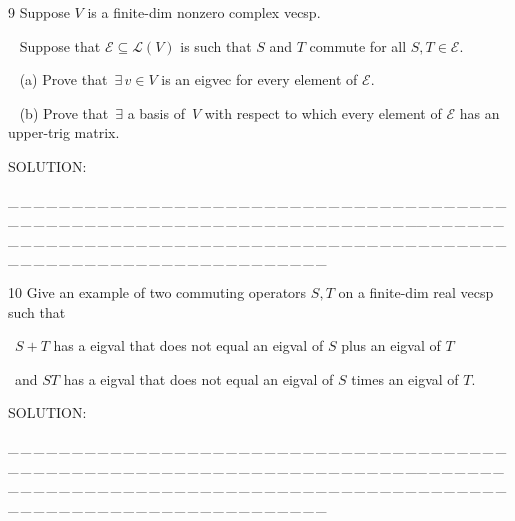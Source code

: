 \documentclass[a4paper, 11pt, UTF8]{article}
\def\Lm{\mathcal{L}}
\begin{document}
\begin{large}
{\timesbf\Large 9} {\timessl\Large 
Suppose $V$ is a finite-dim nonzero complex vecsp.}\par\,\,\,
{\timessl\Large Suppose that $\mathcal{E}\subseteq\Lm(V)$ is such that $S$ and $T$ commute for all $S, T\in\mathcal{E}$.
}\par\,\,\,
(a) {\timessl\Large Prove that $\,\exists\,v\in V$ is an eigvec for every element of $\mathcal{E}$.}\par\,\,\,
(b) {\timessl\Large Prove that $\,\exists$ a basis of \,$V$ with respect to which every element of $\mathcal{E}$ has an upper-trig matrix.}\par
{\timesbf S\footnotesize{OLUTION:}}\par\quad

\par
{\tiny \_\,\_\,\_\,\_\,\_\,\_\,\_\,\_\,\_\,\_\,\_\,\_\,\_\,\_\,\_\,\_\,\_\,\_\,\_\,\_\,\_\,\_\,\_\,\_\,\_\,\_\,\_\,\_\,\_\,\_\,\_\,\_\,\_\,\_\,\_\,\_\,\_\,\_\,\_\,\_\,\_\,\_\,\_\,\_\,\_\,\_\,\_\,\_\,\_\,\_\,\_\,\_\,\_\,\_\,\_\,\_\,\_\,\_\,\_\,\_\,\_\,\_\,\_\,\_\,\_\,\_\,\_\,\_\,\_\,\_\,\_\_\,\_\,\_\,\_\,\_\,\_\,\_\,\_\,\_\,\_\,\_\,\_\,\_\,\_\,\_\,\_\,\_\,\_\,\_\,\_\,\_\,\_\,\_\,\_\,\_\,\_\,\_\,\_\,\_\,\_\,\_\,\_\,\_\,\_\,\_\,\_\,\_\,\_\,\_\,\_\,\_\,\_\,\_\,\_\,\_\,\_\,\_\,\_\,\_\,\_\,\_\,\_\,\_\,\_\,\_\,\_\,\_\,\_\,\_\,\_\,\_\,\_\,\_\,\_\,\_\,\_\,\_\,\_\,\_\,\_\,\_}\par

{\timesbf\Large 10} {\timessl\Large 
Give an example of two commuting operators $S, T$ on a finite-dim real vecsp such that}\par\quad\,
{\timessl\Large $S + T$ has a eigval that does not equal an eigval of $S$ plus an eigval of $T$}\par\quad\,
{\timessl\Large and $ST$ has a eigval that does not equal an eigval of $S$ times an eigval of $T$.
}\par
{\timesbf S\footnotesize{OLUTION:}}\par\quad

\par
{\tiny \_\,\_\,\_\,\_\,\_\,\_\,\_\,\_\,\_\,\_\,\_\,\_\,\_\,\_\,\_\,\_\,\_\,\_\,\_\,\_\,\_\,\_\,\_\,\_\,\_\,\_\,\_\,\_\,\_\,\_\,\_\,\_\,\_\,\_\,\_\,\_\,\_\,\_\,\_\,\_\,\_\,\_\,\_\,\_\,\_\,\_\,\_\,\_\,\_\,\_\,\_\,\_\,\_\,\_\,\_\,\_\,\_\,\_\,\_\,\_\,\_\,\_\,\_\,\_\,\_\,\_\,\_\,\_\,\_\,\_\,\_\_\,\_\,\_\,\_\,\_\,\_\,\_\,\_\,\_\,\_\,\_\,\_\,\_\,\_\,\_\,\_\,\_\,\_\,\_\,\_\,\_\,\_\,\_\,\_\,\_\,\_\,\_\,\_\,\_\,\_\,\_\,\_\,\_\,\_\,\_\,\_\,\_\,\_\,\_\,\_\,\_\,\_\,\_\,\_\,\_\,\_\,\_\,\_\,\_\,\_\,\_\,\_\,\_\,\_\,\_\,\_\,\_\,\_\,\_\,\_\,\_\,\_\,\_\,\_\,\_\,\_\,\_\,\_\,\_\,\_\,\_}\par


\end{large}
\end{document}
